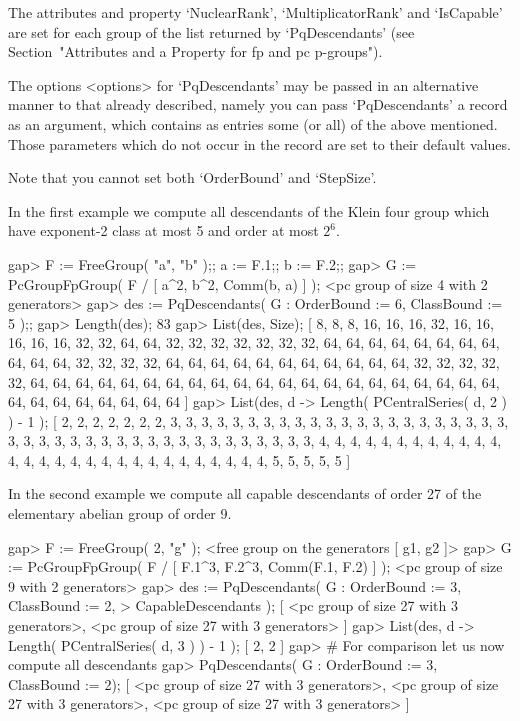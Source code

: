 The  attributes  and  property  `NuclearRank',  `MultiplicatorRank'   and
`IsCapable'  are  set  for  each  group   of   the   list   returned   by
`PqDescendants' (see Section~"Attributes and a Property  for  fp  and  pc
p-groups").

The options <options> for `PqDescendants' may be passed in an alternative
manner to that already described, namely you can pass  `PqDescendants'  a
record as an argument, which contains as entries some  (or  all)  of  the
above mentioned. Those parameters which do not occur in  the  record  are
set to their default values.

Note that you cannot set both `OrderBound' and `StepSize'.

In the first example  we  compute all descendants of the Klein four group
which have exponent-2 class at most 5 and order at most $2^6$.

\beginexample
gap> F := FreeGroup( "a", "b" );; a := F.1;; b := F.2;;         
gap> G := PcGroupFpGroup( F / [ a^2, b^2, Comm(b, a) ] );
<pc group of size 4 with 2 generators>
gap> des := PqDescendants( G : OrderBound := 6, ClassBound := 5 );;
gap> Length(des);
83
gap> List(des, Size); 
[ 8, 8, 8, 16, 16, 16, 32, 16, 16, 16, 16, 16, 32, 32, 64, 64, 32, 32, 32, 
  32, 32, 32, 32, 64, 64, 64, 64, 64, 64, 64, 64, 64, 64, 64, 32, 32, 32, 32, 
  64, 64, 64, 64, 64, 64, 64, 64, 64, 64, 64, 32, 32, 32, 32, 32, 64, 64, 64, 
  64, 64, 64, 64, 64, 64, 64, 64, 64, 64, 64, 64, 64, 64, 64, 64, 64, 64, 64, 
  64, 64, 64, 64, 64, 64, 64 ]
gap> List(des, d -> Length( PCentralSeries( d, 2 ) ) - 1 );
[ 2, 2, 2, 2, 2, 2, 2, 3, 3, 3, 3, 3, 3, 3, 3, 3, 3, 3, 3, 3, 3, 3, 3, 3, 3, 
  3, 3, 3, 3, 3, 3, 3, 3, 3, 3, 3, 3, 3, 3, 3, 3, 3, 3, 3, 3, 3, 3, 3, 3, 4, 
  4, 4, 4, 4, 4, 4, 4, 4, 4, 4, 4, 4, 4, 4, 4, 4, 4, 4, 4, 4, 4, 4, 4, 4, 4, 
  4, 4, 4, 5, 5, 5, 5, 5 ]
\endexample

In the second example we compute all  capable descendants of order  27 of
the  elementary abelian group of order 9.  

\beginexample
gap> F := FreeGroup( 2, "g" );
<free group on the generators [ g1, g2 ]>
gap> G := PcGroupFpGroup( F / [ F.1^3, F.2^3, Comm(F.1, F.2) ] );
<pc group of size 9 with 2 generators>
gap> des := PqDescendants( G : OrderBound := 3, ClassBound := 2,
>                              CapableDescendants );
[ <pc group of size 27 with 3 generators>, 
  <pc group of size 27 with 3 generators> ]
gap> List(des, d -> Length( PCentralSeries( d, 3 ) ) - 1 );
[ 2, 2 ]
gap> # For comparison let us now compute all descendants
gap> PqDescendants( G : OrderBound := 3, ClassBound := 2);
[ <pc group of size 27 with 3 generators>, 
  <pc group of size 27 with 3 generators>, 
  <pc group of size 27 with 3 generators> ]
\endexample

